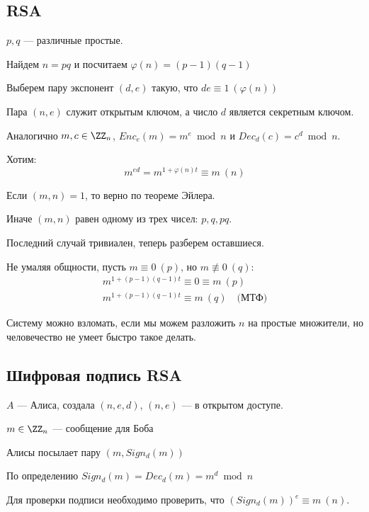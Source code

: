 \newpage

\subsection{RSA}

\( p, q \) --- различные простые.

Найдем \( n = pq \) и посчитаем \( \varphi(n) = (p - 1)(q - 1) \)

Выберем пару экспонент \( (d, e) \) такую, что \( de \equiv 1 \: (\varphi(n)) \)

Пара \( (n, e) \) служит открытым ключом,
а число \( d \) является секретным ключом.

Аналогично \( m, c \in \ZZ_n \), \( Enc_e(m) = m^e \bmod n \) и \( Dec_d (c) = c^d \bmod n \).

Хотим:
\[
    m^{ed} = m^{1 + \varphi(n) t} \equiv m \: (n)
\]

Если \( (m, n) = 1 \), то верно по теореме Эйлера.

Иначе \( (m, n) \) равен одному из трех чисел: \( p, q, pq \).

Последний случай тривиален, теперь разберем оставшиеся.

Не умаляя общности, пусть \( m \equiv 0 \: (p) \), но \( m \not\equiv 0 \: (q) \):
\begin{gather*}
    m^{1 + (p - 1)(q - 1)t} \equiv 0 \equiv m \: (p)
    \\
    m^{1 + (p - 1)(q - 1)t} \equiv m \: (q) \quad \text{(МТФ)}
\end{gather*}

\begin{remark}{}{}    
    Систему можно взломать, если мы можем разложить \( n \) на простые множители,
    но человечество не умеет быстро такое делать.
\end{remark}

\subsection{Шифровая подпись RSA}

\( A \) --- Алиса, создала \( (n, e, d) \), \( (n, e) \) --- в открытом доступе.

\( m \in \ZZ_n \) --- сообщение для Боба

Алисы посылает пару \( (m, Sign_d (m)) \)

По определению \( Sign_d (m) = Dec_d (m) = m^d \bmod n \)

Для проверки подписи необходимо проверить, что \( \left( Sign_d (m) \right)^e \equiv m \: (n) \).

